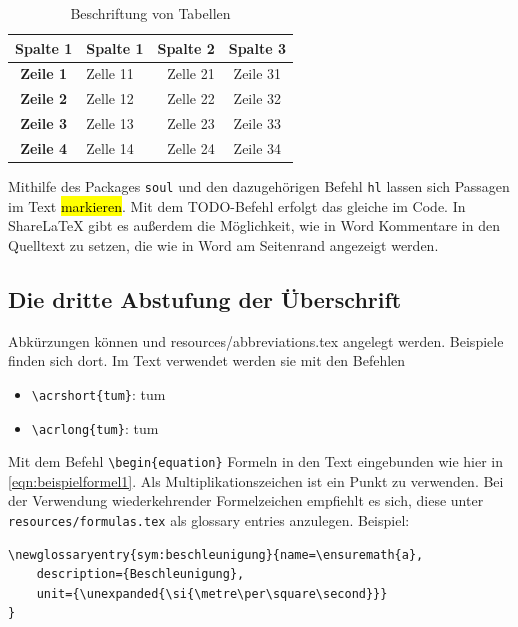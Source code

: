 \begin{table}[htbp]
		\centering
		\caption{Beschriftung von Tabellen}
		\footnotesize
		\begin{tabularx}{0.83\textwidth} {cL{0.5}R{0.5}C{2}} %
			\toprule
			\textbf{Spalte 1} & Spalte 1 &Spalte 2 &Spalte 3 \\ \midrule %
			\textbf{Zeile 1} & Zelle 11 & Zelle 21 & Zeile 31 \\
			\textbf{Zeile 2} & Zelle 12 & Zelle 22 & Zeile 32 \\
			\textbf{Zeile 3} & Zelle 13 & Zelle 23 & Zeile 33 \\ 
			\textbf{Zeile 4} & Zelle 14 & Zelle 24 & Zeile 34 \\ \bottomrule
		\end{tabularx}
		\label{tab:beispieltabelle}
\end{table}



Mithilfe des Packages \verb|soul| und den dazugehörigen Befehl \verb|hl| lassen sich Passagen im Text \hl{markieren}. Mit dem TODO-Befehl erfolgt das gleiche im Code. %
In ShareLaTeX gibt es außerdem die Möglichkeit, wie in Word Kommentare in den Quelltext zu setzen, die wie in Word am Seitenrand angezeigt werden.

\subsection{Die dritte Abstufung der Überschrift}

Abkürzungen können und resources/abbreviations.tex angelegt werden. Beispiele finden sich dort. Im Text verwendet werden sie mit den Befehlen
\begin{itemize}
    \item \verb|\acrshort{tum}|: \acrshort{tum}
    \item \verb|\acrlong{tum}|: \acrlong{tum}
\end{itemize}

Mit dem Befehl \verb|\begin{equation}| Formeln in den Text eingebunden wie hier in \cref{eqn:beispielformel1}. Als Multiplikationszeichen ist ein Punkt zu verwenden. Bei der Verwendung wiederkehrender Formelzeichen empfiehlt es sich, diese unter \verb|resources/formulas.tex| als glossary entries anzulegen. Beispiel:
\begin{verbatim}
\newglossaryentry{sym:beschleunigung}{name=\ensuremath{a},
	description={Beschleunigung},
	unit={\unexpanded{\si{\metre\per\square\second}}}
}
\end{verbatim}	

